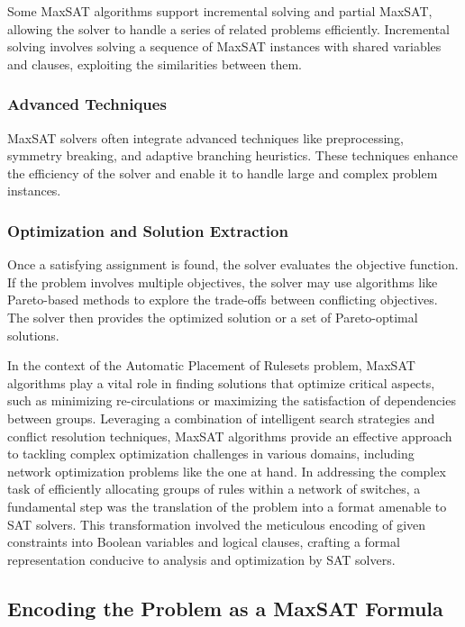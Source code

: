 Some MaxSAT algorithms support incremental solving and partial MaxSAT, allowing the solver to handle a series of related problems efficiently. Incremental solving involves solving a sequence of MaxSAT instances with shared variables and clauses, exploiting the similarities between them.

\subsubsection{Advanced Techniques}

MaxSAT solvers often integrate advanced techniques like preprocessing, symmetry breaking, and adaptive branching heuristics. These techniques enhance the efficiency of the solver and enable it to handle large and complex problem instances.

\subsubsection{Optimization and Solution Extraction}

Once a satisfying assignment is found, the solver evaluates the objective function. If the problem involves multiple objectives, the solver may use algorithms like Pareto-based methods to explore the trade-offs between conflicting objectives. The solver then provides the optimized solution or a set of Pareto-optimal solutions.

In the context of the Automatic Placement of Rulesets problem, MaxSAT algorithms play a vital role in finding solutions that optimize critical aspects, such as minimizing re-circulations or maximizing the satisfaction of dependencies between groups. Leveraging a combination of intelligent search strategies and conflict resolution techniques, MaxSAT algorithms provide an effective approach to tackling complex optimization challenges in various domains, including network optimization problems like the one at hand.
In addressing the complex task of efficiently allocating groups of rules within a network of switches, a fundamental step was the translation of the problem into a format amenable to SAT solvers. This transformation involved the meticulous encoding of given constraints into Boolean variables and logical clauses, crafting a formal representation conducive to analysis and optimization by SAT solvers.

\subsection{Encoding the Problem as a MaxSAT Formula}

